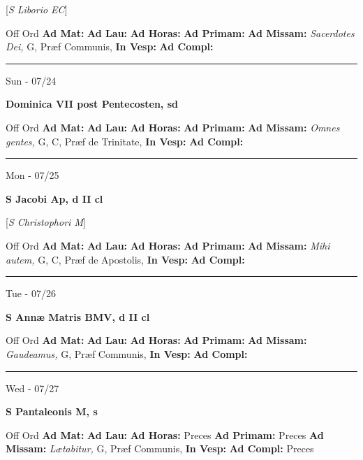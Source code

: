\documentclass[letterpaper, 10pt]{article}
\begin{document}
[\textit{S Liborio EC}]
\begin{justify}
Off Ord
\textbf{Ad Mat: }
\textbf{Ad Lau: }
\textbf{Ad Horas: }
\textbf{Ad Primam: }
\textbf{Ad Missam:} \textit{Sacerdotes Dei, } G, Præf Communis, 
\textbf{In Vesp: }
\textbf{Ad Compl: }\end{justify}



\hrule
\begin{center}
Sun - 07/24
\end{center}\textbf{ \large Dominica VII post Pentecosten, \textnormal{\normalsize sd}}
\begin{justify}
Off Ord
\textbf{Ad Mat: }
\textbf{Ad Lau: }
\textbf{Ad Horas: }
\textbf{Ad Primam: }
\textbf{Ad Missam:} \textit{Omnes gentes, } G, C, Præf de Trinitate, 
\textbf{In Vesp: }
\textbf{Ad Compl: }\end{justify}



\hrule
\begin{center}
Mon - 07/25
\end{center}\textbf{ \large S Jacobi Ap, \textnormal{\normalsize d II cl}}

[\textit{S Christophori M}]
\begin{justify}
Off Ord
\textbf{Ad Mat: }
\textbf{Ad Lau: }
\textbf{Ad Horas: }
\textbf{Ad Primam: }
\textbf{Ad Missam:} \textit{Mihi autem, } G, C, Præf de Apostolis, 
\textbf{In Vesp: }
\textbf{Ad Compl: }\end{justify}



\hrule
\begin{center}
Tue - 07/26
\end{center}\textbf{ \large S Annæ Matris BMV, \textnormal{\normalsize d II cl}}
\begin{justify}
Off Ord
\textbf{Ad Mat: }
\textbf{Ad Lau: }
\textbf{Ad Horas: }
\textbf{Ad Primam: }
\textbf{Ad Missam:} \textit{Gaudeamus, } G, Præf Communis, 
\textbf{In Vesp: }
\textbf{Ad Compl: }\end{justify}



\hrule
\begin{center}
Wed - 07/27
\end{center}\textbf{ \large S Pantaleonis M, \textnormal{\normalsize s}}
\begin{justify}
Off Ord
\textbf{Ad Mat: }
\textbf{Ad Lau: }
\textbf{Ad Horas: }Preces
\textbf{Ad Primam: }Preces
\textbf{Ad Missam:} \textit{Lætabitur, } G, Præf Communis, 
\textbf{In Vesp: }
\textbf{Ad Compl: }Preces\end{justify}
\end{document}
